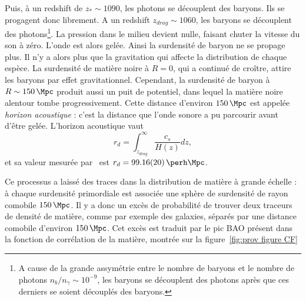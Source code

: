 \documentclass[11pt, twoside, a4paper, openright]{report}
\begin{document}
Puis, à un redshift de $z_{\ast} \sim 1090$, les photons se découplent des baryons. Ils se progagent donc librement.
A un redshift $z_{drag} \sim 1060$, les baryons se découplent des photons\footnote{A cause de la grande assymétrie entre le nombre de baryons et le nombre de photons $n_{b} / n_{\gamma} \sim 10^{-9}$, les baryons se découplent des photons après que ces derniers se soient découplés des baryons.}. La pression dans le milieu devient nulle, faisant chuter la vitesse du son à zéro. L'onde est alors gelée. Ainsi la surdensité de baryon ne se propage plus. Il n'y a alors plus que la gravitation qui affecte la distribution de chaque espèce.
La surdensité de matière noire à $R = 0$, qui a continué de croître, attire les baryons par effet gravitationnel. Cependant, la surdensité de baryon à $R \sim \SI{150}{\Mpc}$ produit aussi un puit de potentiel, dans lequel la matière noire alentour tombe progressivement.
Cette distance d'environ $\SI{150}{\Mpc}$ est appelée \emph{horizon acoustique} : c'est la distance que l'onde sonore a pu parcourir avant d'être gelée. L'horizon acoustique vaut
\begin{equation}
  \label{eq:sound_horizon}
  r_{d} = \int^{\infty}_{z_{drag}} \frac{c_{s}}{H(z)} dz ,
\end{equation}
et sa valeur mesurée par~\cite{Collaboration2018} est $r_{d} = \SI{99.16(20)}{\perh\Mpc}$.

Ce processus a laissé des traces dans la distribution de matière à grande échelle : à chaque surdensité primordiale est associée une sphère de surdensité de rayon comobile $\SI{150}{\Mpc}$.
Il y a donc un excès de probabilité de trouver deux traceurs de densité de matière, comme par exemple des galaxies, séparés par une distance  comobile d'environ $\SI{150}{\Mpc}$.
Cet excès est traduit par le pic BAO présent dans la fonction de corrélation de la matière, montrée sur la figure~\ref{fig:prov figure CF}
\end{document}
